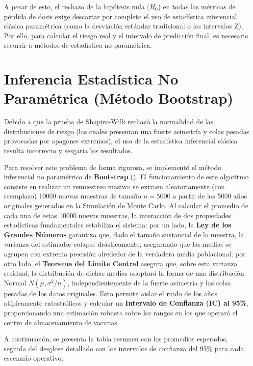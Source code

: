 \documentclass[
  spanish,
  us-letterpaper,
]{scrreprt}
\numberwithin{equation}{section}
\theoremstyle{plain}
\theoremstyle{plain}
\theoremstyle{plain}
\theoremstyle{definition}
\theoremstyle{remark}
\begin{document}
A pesar de esto, el rechazo de la hipótesis nula (\(H_0\)) en todas las
métricas de pérdida de dosis exige descartar por completo el uso de
estadística inferencial clásica paramétrica (como la desviación estándar
tradicional o los intervalos Z). Por ello, para calcular el riesgo real
y el intervalo de predicción final, es necesario recurrir a métodos de
estadística no paramétrica.

\section{Inferencia Estadística No Paramétrica (Método
Bootstrap)}\label{inferencia-estaduxedstica-no-paramuxe9trica-muxe9todo-bootstrap}

Debido a que la prueba de Shapiro-Wilk rechazó la normalidad de las
distribuciones de riesgo (las cuales presentan una fuerte asimetría y
colas pesadas provocadas por apagones extremos), el uso de la
estadística inferencial clásica resulta incorrecto y sesgaría los
resultados.

Para resolver este problema de forma rigurosa, se implementó el método
inferencial no paramétrico de \textbf{Bootstrap}
(). El
funcionamiento de este algoritmo consiste en realizar un remuestreo
masivo: se extraen aleatoriamente (con reemplazo) 10000 nuevas muestras
de tamaño \(n = 5000\) a partir de los 5000 años originales generados en
la Simulación de Monte Carlo. Al calcular el promedio de cada una de
estas 10000 nuevas muestras, la interacción de dos propiedades
estadísticas fundamentales estabiliza el sistema: por un lado, la
\textbf{Ley de los Grandes Números} garantiza que, dado el tamaño
sustancial de la muestra, la varianza del estimador colapse
drásticamente, asegurando que las medias se agrupen con extrema
precisión alrededor de la verdadera media poblacional; por otro lado, el
\textbf{Teorema del Límite Central} asegura que, sobre esta varianza
residual, la distribución de dichas medias adoptará la forma de una
distribución Normal \(N(\mu, \sigma^2/n)\), independientemente de la
fuerte asimetría y las colas pesadas de los datos originales. Esto
permite aislar el ruido de los años atípicamente catastróficos y
calcular un \textbf{Intervalo de Confianza (IC) al 95\%}, proporcionando
una estimación robusta sobre los rangos en los que operará el centro de
almacenamiento de vacunas.

A continuación, se presenta la tabla resumen con los promedios
esperados, seguida del desglose detallado con los intervalos de
confianza del 95\% para cada escenario operativo.
\end{document}
